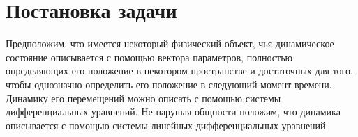 \chapter{Постановка задачи}



Предположим, что имеется некоторый физический объект, чья динамическое состояние описывается с помощью вектора параметров, полностью определяющих его положение в некотором пространстве и достаточных для того, чтобы однозначно определить его положение в следующий момент времени. Динамику его перемещений можно описать с помощью системы дифференциальных уравнений. Не нарушая общности положим, что динамика описывается с помощью системы линейных дифференциальных уравнений

\eeq
